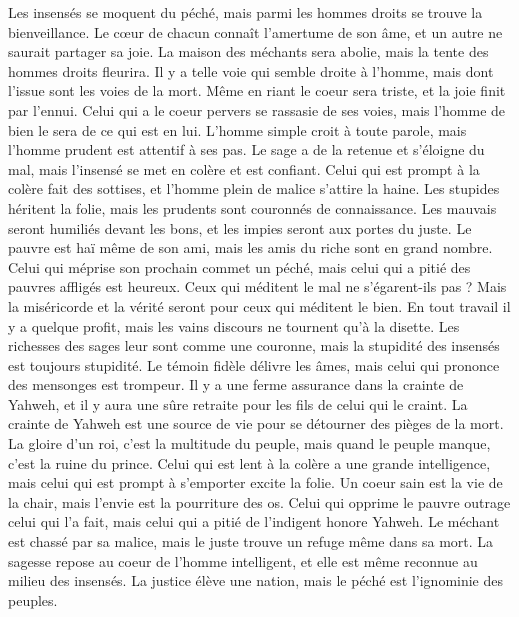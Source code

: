\begin{multicols}{2}
Les insensés se moquent du péché, mais parmi les hommes droits se trouve la bienveillance.
Le cœur de chacun connaît l'amertume de son âme, et un autre ne saurait partager sa joie.
La maison des méchants sera abolie, mais la tente des hommes droits fleurira.
Il y a telle voie qui semble droite à l'homme, mais dont l'issue sont les voies de la mort.
Même en riant le coeur sera triste, et la joie finit par l'ennui.
Celui qui a le coeur pervers se rassasie de ses voies, mais l'homme de bien le sera de ce qui est en lui.
L'homme simple croit à toute parole, mais l'homme prudent est attentif à ses pas.
Le sage a de la retenue et s'éloigne du mal, mais l'insensé se met en colère et est confiant.
Celui qui est prompt à la colère fait des sottises, et l'homme plein de malice s'attire la haine.
Les stupides héritent la folie, mais les prudents sont couronnés de connaissance.
Les mauvais seront humiliés devant les bons, et les impies seront aux portes du juste.
Le pauvre est haï même de son ami, mais les amis du riche sont en grand nombre.
Celui qui méprise son prochain commet un péché, mais celui qui a pitié des pauvres affligés est heureux.
Ceux qui méditent le mal ne s'égarent-ils pas ? Mais la miséricorde et la vérité seront pour ceux qui méditent le bien.
En tout travail il y a quelque profit, mais les vains discours ne tournent qu'à la disette.
Les richesses des sages leur sont comme une couronne, mais la stupidité des insensés est toujours stupidité.
Le témoin fidèle délivre les âmes, mais celui qui prononce des mensonges est trompeur.
Il y a une ferme assurance dans la crainte de Yahweh, et il y aura une sûre retraite pour les fils de celui qui le craint.
La crainte de Yahweh est une source de vie pour se détourner des pièges de la mort.
La gloire d'un roi, c'est la multitude du peuple, mais quand le peuple manque, c'est la ruine du prince.
Celui qui est lent à la colère a une grande intelligence, mais celui qui est prompt à s'emporter excite la folie.
Un coeur sain est la vie de la chair, mais l'envie est la pourriture des os.
Celui qui opprime le pauvre outrage celui qui l'a fait, mais celui qui a pitié de l'indigent honore Yahweh.
Le méchant est chassé par sa malice, mais le juste trouve un refuge même dans sa mort.
La sagesse repose au coeur de l'homme intelligent, et elle est même reconnue au milieu des insensés.
La justice élève une nation, mais le péché est l'ignominie des peuples.

\end{multicols}
